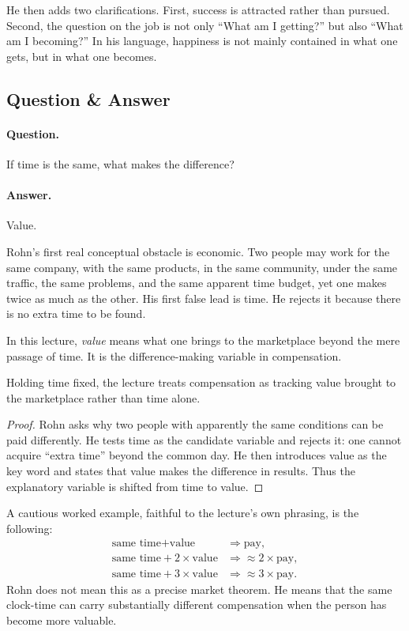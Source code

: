 He then adds two clarifications. First, success is attracted rather than pursued. Second, the question on the job is not only ``What am I getting?'' but also ``What am I becoming?'' In his language, happiness is not mainly contained in what one gets, but in what one becomes.

\subsection{Question \& Answer}

\paragraph{Question.} If time is the same, what makes the difference?

\paragraph{Answer.} Value.

Rohn's first real conceptual obstacle is economic. Two people may work for the same company, with the same products, in the same community, under the same traffic, the same problems, and the same apparent time budget, yet one makes twice as much as the other. His first false lead is time. He rejects it because there is no extra time to be found.

\begin{definition}
In this lecture, \emph{value} means what one brings to the marketplace beyond the mere passage of time. It is the difference-making variable in compensation.
\end{definition}

\begin{proposition}
Holding time fixed, the lecture treats compensation as tracking value brought to the marketplace rather than time alone.
\end{proposition}

\begin{proof}
Rohn asks why two people with apparently the same conditions can be paid differently. He tests time as the candidate variable and rejects it: one cannot acquire ``extra time'' beyond the common day. He then introduces value as the key word and states that value makes the difference in results. Thus the explanatory variable is shifted from time to value.
\end{proof}

A cautious worked example, faithful to the lecture's own phrasing, is the following:
\begin{align}
\text{same time} + \text{value} &\Rightarrow \text{pay},\\
\text{same time} + 2\times \text{value} &\Rightarrow \approx 2\times \text{pay},\\
\text{same time} + 3\times \text{value} &\Rightarrow \approx 3\times \text{pay}.
\end{align}
Rohn does not mean this as a precise market theorem. He means that the same clock-time can carry substantially different compensation when the person has become more valuable.

